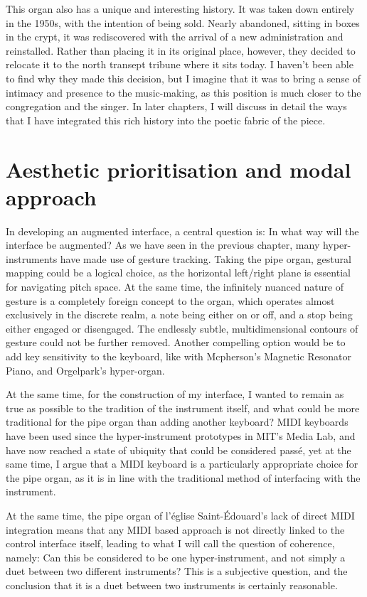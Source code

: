 \documentclass[12pt,twoside,maitrise]{dms_ks}
\theoremstyle{definition}
\begin{document}
{This organ also has a unique and interesting history. 
It was taken down entirely in the 1950s, with the intention of being sold. 
Nearly abandoned, sitting in boxes in the crypt, it was rediscovered with the arrival of a new administration and reinstalled. 
Rather than placing it in its original place, however, they decided to relocate it to the north transept tribune where it sits today. 
I haven't been able to find why they made this decision, but I imagine that it was to bring a sense of intimacy and presence to the music-making, as this position is much closer to the congregation and the singer. 
In later chapters, I will discuss in detail the ways that I have integrated this rich history into the poetic fabric of the piece.

\section{Aesthetic prioritisation and modal approach}

In developing an augmented interface, a central question is: In what way will the interface be augmented?
As we have seen in the previous chapter, many hyper-instruments have made use of gesture tracking.
Taking the pipe organ, gestural mapping could be a logical choice, as the horizontal left/right plane is essential for navigating pitch space.
At the same time, the infinitely nuanced nature of gesture is a completely foreign concept to the organ, which operates almost exclusively in the discrete realm, a note being either on or off, and a stop being either engaged or disengaged.
The endlessly subtle, multidimensional contours of gesture could not be further removed.
Another compelling option would be to add key sensitivity to the keyboard, like with Mcpherson's Magnetic Resonator Piano, and Orgelpark's hyper-organ. 

At the same time, for the construction of my interface, I wanted to remain as true as possible to the tradition of the instrument itself, and what could be more traditional for the pipe organ than adding another keyboard?
MIDI keyboards have been used since the hyper-instrument prototypes in MIT's Media Lab, and have now reached a state of ubiquity that could be considered passé, yet at the same time, I argue that a MIDI keyboard is a particularly appropriate choice for the pipe organ, as it is in line with the traditional method of interfacing with the instrument.

At the same time, the pipe organ of l'église Saint-Édouard's lack of direct MIDI integration means that any MIDI based approach is not directly linked to the control interface itself, leading to what I will call the question of coherence, namely: Can this be considered to be one hyper-instrument, and not simply a duet between two different instruments?
This is a subjective question, and the conclusion that it is a duet between two instruments is certainly reasonable.

}
\end{document}

